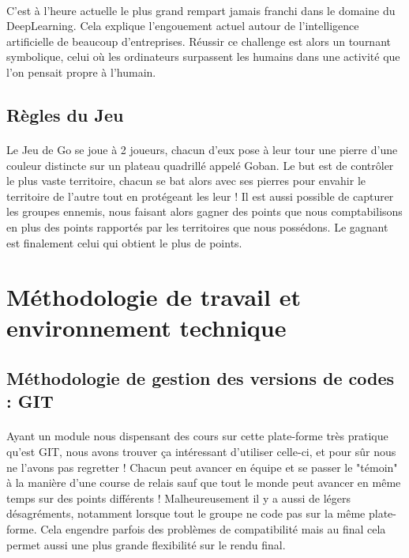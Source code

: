             \paragraph{}C'est à l'heure actuelle le plus grand rempart jamais franchi dans le domaine du DeepLearning. Cela explique l'engouement actuel autour de l'intelligence artificielle de beaucoup d'entreprises. Réussir ce challenge est alors un tournant symbolique, celui où les ordinateurs surpassent les humains dans une activité que l'on pensait propre à l'humain.
    
        \subsection{Règles du Jeu}
            \paragraph{}Le Jeu de Go se joue à 2 joueurs, chacun d'eux pose à leur tour une pierre d'une couleur distincte sur un plateau quadrillé appelé Goban. Le but est de contrôler le plus vaste territoire, chacun se bat alors avec ses pierres pour envahir le territoire de l'autre tout en protégeant les leur  ! Il est aussi possible de capturer les groupes ennemis, nous faisant alors gagner des points que nous comptabilisons en plus des points rapportés par les territoires que nous possédons. Le gagnant est finalement celui qui obtient le plus de points.


    \section{Méthodologie de travail et environnement technique}
        \subsection{Méthodologie de gestion des versions de codes : GIT}
            \paragraph{}Ayant un module nous dispensant des cours sur cette plate-forme très pratique qu'est GIT, nous avons trouver ça intéressant d'utiliser celle-ci, et pour sûr nous ne l'avons pas regretter ! Chacun peut avancer en équipe et se passer le "témoin" à la manière d'une course de relais sauf que tout le monde peut avancer en même temps sur des points différents ! Malheureusement il y a aussi de légers désagréments, notamment lorsque tout le groupe ne code pas sur la même plate-forme. Cela engendre parfois des problèmes de compatibilité mais au final cela permet aussi une plus grande flexibilité sur le rendu final.
            
